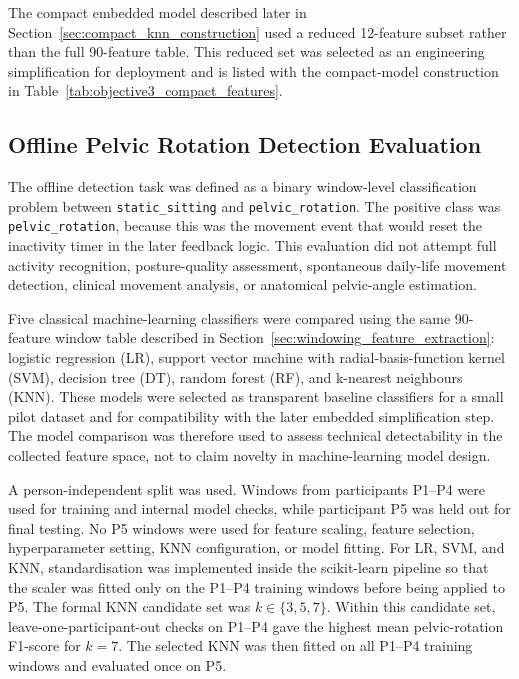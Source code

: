 The compact embedded model described later in Section~\ref{sec:compact_knn_construction} used a reduced 12-feature subset rather than the full 90-feature table. This reduced set was selected as an engineering simplification for deployment and is listed with the compact-model construction in Table~\ref{tab:objective3_compact_features}.

\subsection{Offline Pelvic Rotation Detection Evaluation}\label{sec:offline_pelvic_rotation_detection}

The offline detection task was defined as a binary window-level classification problem between \texttt{static\_sitting} and \texttt{pelvic\_rotation}. The positive class was \texttt{pelvic\_rotation}, because this was the movement event that would reset the inactivity timer in the later feedback logic. This evaluation did not attempt full activity recognition, posture-quality assessment, spontaneous daily-life movement detection, clinical movement analysis, or anatomical pelvic-angle estimation.

Five classical machine-learning classifiers were compared using the same 90-feature window table described in Section~\ref{sec:windowing_feature_extraction}: logistic regression (LR), support vector machine with radial-basis-function kernel (SVM), decision tree (DT), random forest (RF), and k-nearest neighbours (KNN). These models were selected as transparent baseline classifiers for a small pilot dataset and for compatibility with the later embedded simplification step. The model comparison was therefore used to assess technical detectability in the collected feature space, not to claim novelty in machine-learning model design.

A person-independent split was used. Windows from participants P1--P4 were used for training and internal model checks, while participant P5 was held out for final testing. No P5 windows were used for feature scaling, feature selection, hyperparameter setting, KNN configuration, or model fitting. For LR, SVM, and KNN, standardisation was implemented inside the scikit-learn pipeline so that the scaler was fitted only on the P1--P4 training windows before being applied to P5. The formal KNN candidate set was \(k \in \{3,5,7\}\). Within this candidate set, leave-one-participant-out checks on P1--P4 gave the highest mean pelvic-rotation F1-score for \(k=7\). The selected KNN was then fitted on all P1--P4 training windows and evaluated once on P5.

